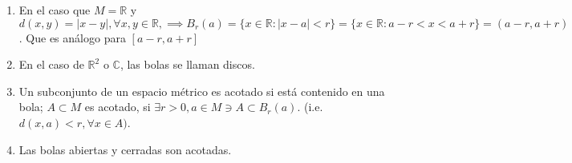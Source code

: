 \begin{remark}
\begin{enumerate}
    \item En el caso que $M=\mathbb{R}$ y $d(x,y)=|x-y|,\forall x,y\in\mathbb{R},\implies B_r(a)=\{x\in\mathbb{R}:|x-a|<r\} =\{x\in\mathbb{R}: a-r<x<a+r\}=(a-r,a+r)$. Que es análogo para $[a-r,a+r]$
    \item En el caso de $\mathbb{R}^2$ o $\mathbb{C}$, las bolas se llaman discos. 
    \item Un subconjunto de un espacio métrico es acotado si está contenido en una bola; $A\subset M$ es acotado, si $\exists r>0,a\in M\ni A\subset B_r (a)$. (i.e. $d(x,a)<r,\forall x\in A)$.
    \item Las bolas abiertas y cerradas son acotadas. 
\end{enumerate}
\end{remark}
